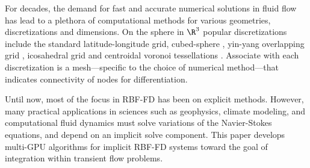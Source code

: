 For decades, the demand for fast and accurate numerical solutions in fluid flow has lead to a plethora of computational methods for various geometries, discretizations and dimensions.  On the sphere in $\R^3$ popular discretizations include the standard latitude-longitude grid, cubed-sphere \cite{NairTransport05}, yin-yang overlapping grid \cite{Kameyama2008a}, icosahedral grid \cite{Randall2002} and centroidal voronoi tessellations \cite{Du2006}. Associate with each discretization is a mesh---specific to the choice of numerical method---that indicates connectivity of nodes for differentiation.


Until now, most of the focus in RBF-FD has been on explicit methods. However, many practical applications in sciences such as geophysics, climate modeling, and computational fluid dynamics must solve variations of the Navier-Stokes equations, and depend on an implicit solve component. This paper develops multi-GPU algorithms for implicit RBF-FD systems toward the goal of integration within transient flow problems. %



